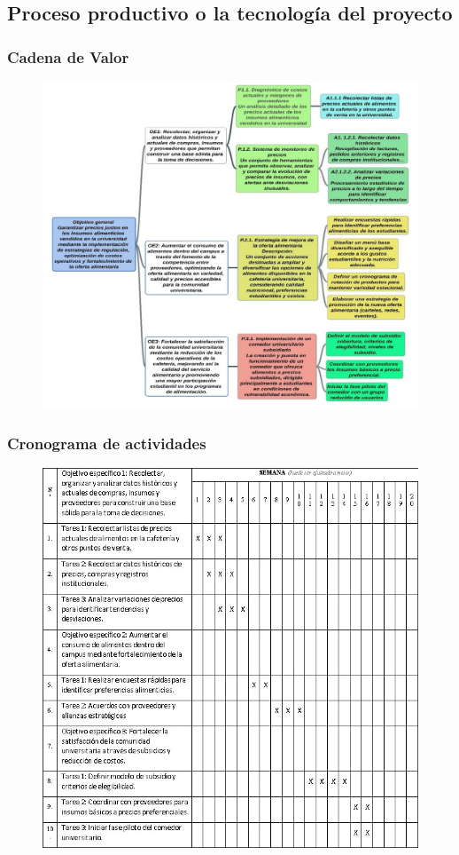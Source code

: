 \documentclass[letterpaper, 11pt]{report}
\begin{document}
\subsection{Proceso productivo o la tecnología del proyecto}

\subsubsection{Cadena de Valor}

\begin{figure}[H]
      \begin{center}
            \includegraphics[width=.6\linewidth]{./Images/cadena_valor.jpg}
            \caption{}
      \end{center}
\end{figure}

\subsubsection{Cronograma de actividades}

\begin{figure}[H]
      \begin{center}
            \includegraphics[width=\linewidth]{./Images/cronograma.jpg}
            \caption{}
      \end{center}
\end{figure}
\end{document}
